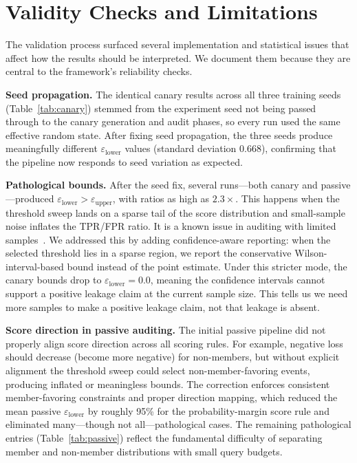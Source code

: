 \documentclass{article}
\begin{document}
\section{Validity Checks and Limitations}
\label{sec:validity}

The validation process surfaced several implementation and statistical issues that affect how the results should be interpreted. We document them because they are central to the framework's reliability checks.

\textbf{Seed propagation.} The identical canary results across all three training seeds (Table~\ref{tab:canary}) stemmed from the experiment seed not being passed through to the canary generation and audit phases, so every run used the same effective random state. After fixing seed propagation, the three seeds produce meaningfully different $\varepsilon_{\text{lower}}$ values (standard deviation 0.668), confirming that the pipeline now responds to seed variation as expected.

\textbf{Pathological bounds.} After the seed fix, several runs---both canary and passive---produced $\varepsilon_{\text{lower}} > \varepsilon_{\text{upper}}$, with ratios as high as $2.3\times$. This happens when the threshold sweep lands on a sparse tail of the score distribution and small-sample noise inflates the TPR/FPR ratio. It is a known issue in auditing with limited samples~\citep{nasr2023tight}. We addressed this by adding confidence-aware reporting: when the selected threshold lies in a sparse region, we report the conservative Wilson-interval-based bound instead of the point estimate. Under this stricter mode, the canary bounds drop to $\varepsilon_{\text{lower}} = 0.0$, meaning the confidence intervals cannot support a positive leakage claim at the current sample size. This tells us we need more samples to make a positive leakage claim, not that leakage is absent.

\textbf{Score direction in passive auditing.} The initial passive pipeline did not properly align score direction across all scoring rules. For example, negative loss should decrease (become more negative) for non-members, but without explicit alignment the threshold sweep could select non-member-favoring events, producing inflated or meaningless bounds. The correction enforces consistent member-favoring constraints and proper direction mapping, which reduced the mean passive $\varepsilon_{\text{lower}}$ by roughly 95\% for the probability-margin score rule and eliminated many---though not all---pathological cases. The remaining pathological entries (Table~\ref{tab:passive}) reflect the fundamental difficulty of separating member and non-member distributions with small query budgets.
\end{document}
